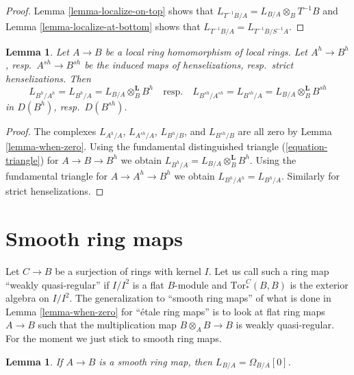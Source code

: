 \documentclass{stacks-project}
\theoremstyle{plain}
\newtheorem{lemma}[subsection]{Lemma}
\theoremstyle{definition}
\theoremstyle{remark}
\numberwithin{equation}{subsection}
\begin{document}
\begin{proof}
Lemma \ref{lemma-localize-on-top} shows that
$L_{T^{-1}B/A} = L_{B/A} \otimes_B T^{-1}B$
and Lemma \ref{lemma-localize-at-bottom}
shows that $L_{T^{-1}B/A} = L_{T^{-1}B/S^{-1}A}$.
\end{proof}

\begin{lemma}
\label{lemma-cotangent-complex-henselization}
Let $A \to B$ be a local ring homomorphism of local rings.
Let $A^h \to B^h$, resp.\ $A^{sh} \to B^{sh}$ be the induced
maps of henselizations, resp.\ strict henselizations.
Then
$$
L_{B^h/A^h} = L_{B^h/A} = L_{B/A} \otimes_B^\mathbf{L} B^h
\quad\text{resp.}\quad
L_{B^{sh}/A^{sh}} = L_{B^{sh}/A} = L_{B/A} \otimes_B^\mathbf{L} B^{sh}
$$
in $D(B^h)$, resp.\ $D(B^{sh})$.
\end{lemma}

\begin{proof}
The complexes $L_{A^h/A}$, $L_{A^{sh}/A}$, $L_{B^h/B}$, and
$L_{B^{sh}/B}$ are all zero by Lemma \ref{lemma-when-zero}.
Using the fundamental distinguished triangle (\ref{equation-triangle})
for $A \to B \to B^h$ we obtain
$L_{B^h/A} = L_{B/A} \otimes_B^\mathbf{L} B^h$.
Using the fundamental triangle for $A \to A^h \to B^h$
we obtain $L_{B^h/A^h} = L_{B^h/A}$.
Similarly for strict henselizations.
\end{proof}




\section{Smooth ring maps}
\label{section-smooth}

\noindent
Let $C \to B$ be a surjection of rings with kernel $I$. Let us call such
a ring map ``weakly quasi-regular'' if $I/I^2$ is a flat $B$-module and
$\text{Tor}_*^C(B, B)$ is the exterior algebra on $I/I^2$.
The generalization to ``smooth ring maps'' of what is done in
Lemma \ref{lemma-when-zero} for ``\'etale ring maps'' is to look
at flat ring maps $A \to B$ such that the multiplication map
$B \otimes_A B \to B$ is weakly quasi-regular. For the moment we just stick to
smooth ring maps.

\begin{lemma}
\label{lemma-when-projective}
If $A \to B$ is a smooth ring map, then $L_{B/A} = \Omega_{B/A}[0]$.
\end{lemma}
\end{document}
